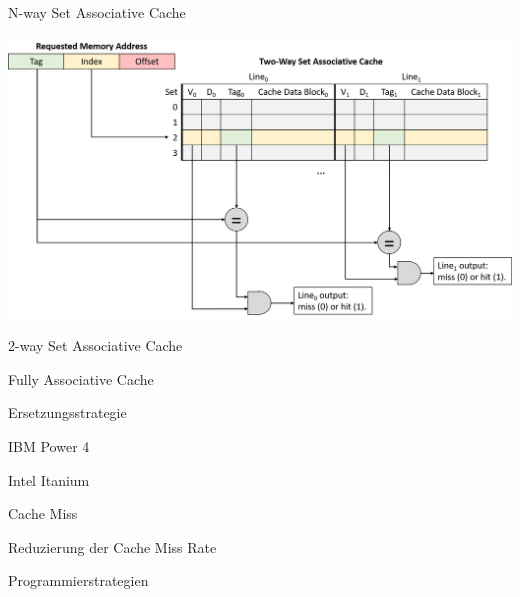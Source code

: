 \begin{defi}{N-way Set Associative Cache}


  \centering
  \includegraphics[width=.9\linewidth]{images/2-way_set_associative_cache_request.png}
\end{defi}

\begin{example}{2-way Set Associative Cache}
\end{example}

\begin{defi}{Fully Associative Cache}

\end{defi}

\begin{defi}{Ersetzungsstrategie}

\end{defi}

\begin{bonus}[Cache]{IBM Power 4}

\end{bonus}

\begin{bonus}[Cache]{Intel Itanium}

\end{bonus}

\begin{defi}{Cache Miss}

\end{defi}

\begin{defi}{Reduzierung der Cache Miss Rate}

\end{defi}

\begin{defi}{Programmierstrategien}

\end{defi}

